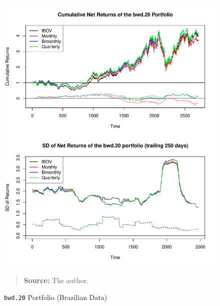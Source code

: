 \documentclass[preprint, doubleblind, authoryear,10pt]{elsarticle}
\begin{document}
\begin{figure}[htpb]
\centering
\footnotesize
\caption{\texttt{bwd.20} Portfolio (Brazilian Data)}
\label{fig:ibov:bwd.20}
\includegraphics[width=.95\linewidth]{./figs/IBOV-retac-bwd-20.pdf}
\begin{quote}
\textbf{Source:} The author.
\end{quote}
\end{figure}
\end{document}
